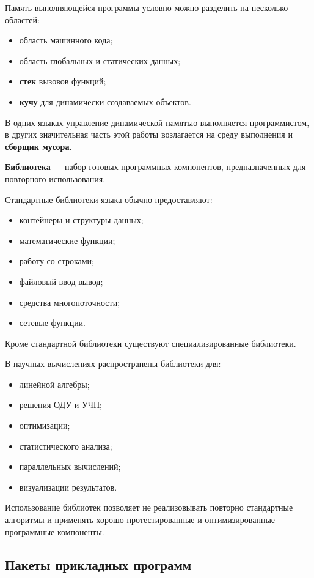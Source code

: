 Память выполняющейся программы условно можно разделить на несколько областей:
\begin{itemize}
	\item область машинного кода;
	\item область глобальных и статических данных;
	\item \textbf{стек} вызовов функций;
	\item \textbf{кучу} для динамически создаваемых объектов.
\end{itemize}

В одних языках управление динамической памятью выполняется программистом, в других значительная часть этой работы возлагается на среду выполнения и \textbf{сборщик мусора}.

\textbf{Библиотека} --- набор готовых программных компонентов, предназначенных для повторного использования.

Стандартные библиотеки языка обычно предоставляют:
\begin{itemize}
	\item контейнеры и структуры данных;
	\item математические функции;
	\item работу со строками;
	\item файловый ввод-вывод;
	\item средства многопоточности;
	\item сетевые функции.
\end{itemize}

Кроме стандартной библиотеки существуют специализированные библиотеки.

В научных вычислениях распространены библиотеки для:
\begin{itemize}
	\item линейной алгебры;
	\item решения ОДУ и УЧП;
	\item оптимизации;
	\item статистического анализа;
	\item параллельных вычислений;
	\item визуализации результатов.
\end{itemize}

Использование библиотек позволяет не реализовывать повторно стандартные алгоритмы и применять хорошо протестированные и оптимизированные программные компоненты.


\subsection{Пакеты прикладных программ}

